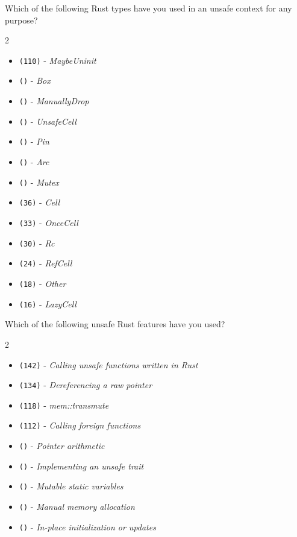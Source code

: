 \begin{protocol}
\item \label{survey:ufq1}  Which of the following Rust types have you used in an unsafe context for any purpose?
\begin{multicols}{2}
\begin{itemize}
\item \texttt{(110)} - \textit{MaybeUninit}
\item \texttt{()} - \textit{Box}
\item \texttt{()} - \textit{ManuallyDrop}
\item \texttt{()} - \textit{UnsafeCell}
\item \texttt{()} - \textit{Pin}
\item \texttt{()} - \textit{Arc}
\item \texttt{()} - \textit{Mutex}
\item \texttt{(36)} - \textit{Cell}
\item \texttt{(33)} - \textit{OnceCell}
\item \texttt{(30)} - \textit{Rc}
\item \texttt{(24)} - \textit{RefCell}
\item \texttt{(18)} - \textit{Other}
\item \texttt{(16)} - \textit{LazyCell}
\end{itemize}
\end{multicols}
\item \label{survey:ufq2}  Which of the following unsafe Rust features have you used?
\begin{multicols}{2}
\begin{itemize}
\item \texttt{(142)} - \textit{Calling unsafe functions written in Rust}
\item \texttt{(134)} - \textit{Dereferencing a raw pointer}
\item \texttt{(118)} - \textit{mem::transmute}
\item \texttt{(112)} - \textit{Calling foreign functions}
\item \texttt{()} - \textit{Pointer arithmetic}
\item \texttt{()} - \textit{Implementing an unsafe trait}
\item \texttt{()} - \textit{Mutable static variables}
\item \texttt{()} - \textit{Manual memory allocation}
\item \texttt{()} - \textit{In-place initialization or updates}

\end{itemize}
\end{multicols}
\end{protocol}
